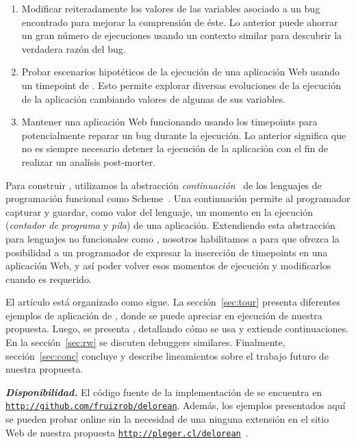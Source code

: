 \documentclass[conference]{IEEEtran}
\begin{document}
\begin{enumerate}
	
	\item Modificar reiteradamente los valores de las variables asociado a un bug encontrado para mejorar la comprensi\'on de \'este. Lo anterior puede ahorrar un gran n\'umero de ejecuciones usando un contexto similar para descubrir la verdadera raz\'on del bug.

	\smallskip

	\item Probar escenarios hipot\'eticos de la ejecuci\'on de una aplicaci\'on Web usando un timepoint de \deloreanjs. Esto permite explorar diversas evoluciones de la ejecuci\'on de la aplicaci\'on cambiando valores de algunas de sus variables.
   
   \smallskip
	 
	\item Mantener una aplicaci\'on Web funcionando usando los timepoints para potencialmente reparar un bug durante la ejecuci\'on. Lo anterior significa que no es siempre necesario detener la ejecuci\'on de la aplicaci\'on con el fin de realizar un anal\'isis post-morter.  

\end{enumerate}


Para construir \deloreanjs, utilizamos la abstracci\'on {\em continuaci\'on}~\cite{fw84} de los lenguajes de programaci\'on funcional como Scheme~\cite{scheme48}. Una continuaci\'on permite al programador capturar y guardar, como valor del lenguaje, un momento en la ejecuci\'on ({\em contador de programa} y {\em pila}) de una aplicaci\'on. Extendiendo esta abstracci\'on para lenguajes no funcionales como \javascript, nosotros habilitamos a \deloreanjs para que ofrezca la posibilidad a un programador de expresar la insercci\'on de timepoints en una aplicaci\'on Web,  y as\'i poder volver esos momentos de ejecuci\'on y modificarlos cuando es requerido.   


El art\'iculo est\'a organizado como sigue. La secci\'on~\ref{sec:tour} presenta diferentes ejemplos de aplicaci\'on de \deloreanjs, donde se puede apreciar en ejecuci\'on de nuestra propuesta. Luego, se presenta \deloreanjs, detallando c\'omo se usa y extiende continuaciones. En la secci\'on~\ref{sec:rw} se discuten debuggers similares. Finalmente, secci\'on~\ref{sec:conc} concluye y describe lineamientos sobre el trabajo futuro de nuestra propuesta.      

\smallskip

{\bf {\em Disponibilidad.}} El c\'odigo fuente de la implementaci\'on de \deloreanjs se encuentra en {\tt \url{http://github.com/fruizrob/delorean}}. Adem\'as, los ejemplos presentados aqu\'i se pueden probar online sin la necesidad de una ninguna extensi\'on en el sitio Web de nuestra propuesta {\tt \url{http://pleger.cl/delorean}}~\cite{deloreanjs}.
\end{document}
